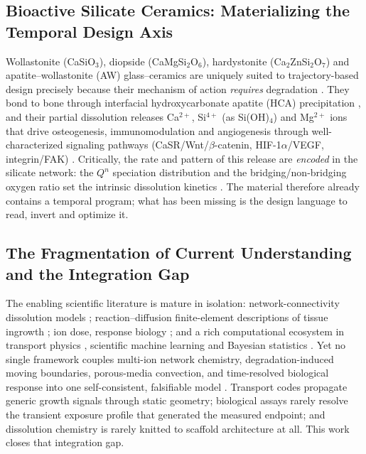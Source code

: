 \documentclass[11pt]{article}
\begin{document}
\subsection{Bioactive Silicate Ceramics: Materializing the Temporal Design Axis}


Wollastonite (CaSiO$_3$), diopside (CaMgSi$_2$O$_6$), hardystonite (Ca$_2$ZnSi$_2$O$_7$) and apatite--wollastonite (AW) glass--ceramics are uniquely suited to trajectory-based design precisely because their mechanism of action \emph{requires} degradation \cite{Dorozhkin2019,Mastrogiacomo2016}. They bond to bone through interfacial hydroxycarbonate apatite (HCA) precipitation \cite{Hench1991,Kokubo2006}, and their partial dissolution releases Ca$^{2+}$, Si$^{4+}$ (as Si(OH)$_4$) and Mg$^{2+}$ ions that drive osteogenesis, immunomodulation and angiogenesis through well-characterized signaling pathways (CaSR/Wnt/$\beta$-catenin, HIF-1$\alpha$/VEGF, integrin/FAK) \cite{Xynos2000,Zhang2021,Polo-Montalvo2021}. Critically, the rate and pattern of this release are \emph{encoded} in the silicate network: the $Q^n$ speciation distribution and the bridging/non-bridging oxygen ratio set the intrinsic dissolution kinetics \cite{Hill2010,Fodor2005,Brauer2015}. The material therefore already contains a temporal program; what has been missing is the design language to read, invert and optimize it.


\subsection{The Fragmentation of Current Understanding and the Integration Gap}


The enabling scientific literature is mature in isolation: network-connectivity dissolution models \cite{Hill2010}; reaction--diffusion finite-element descriptions of tissue ingrowth \cite{VandenHeuvel2023,Zamani2024}; ion dose, response biology \cite{Xynos2000,Polo-Montalvo2021}; and a rich computational ecosystem in transport physics \cite{Crank1984,Tjaden2016}, scientific machine learning \cite{Raissi2019,Chen2018} and Bayesian statistics \cite{Salvatier2016,Carpenter2017,Vehtari2017}. Yet no single framework couples multi-ion network chemistry, degradation-induced moving boundaries, porous-media convection, and time-resolved biological response into one self-consistent, falsifiable model \cite{Hang2025,Song2024}. Transport codes propagate generic growth signals through static geometry; biological assays rarely resolve the transient exposure profile that generated the measured endpoint; and dissolution chemistry is rarely knitted to scaffold architecture at all. This work closes that integration gap.
\end{document}
